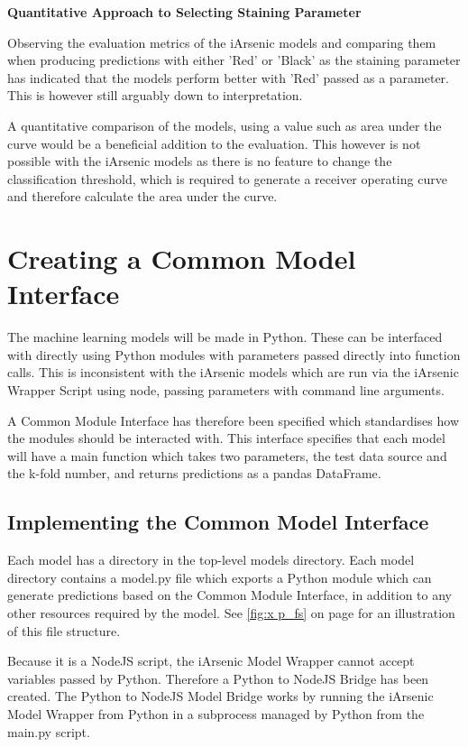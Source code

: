 \newpage

\textbf{Quantitative Approach to Selecting Staining Parameter}

Observing the evaluation metrics of the iArsenic models and comparing them when producing predictions with either 'Red' or 'Black' as the staining parameter has indicated that the models perform better with 'Red' passed as a parameter. This is however still arguably down to interpretation.

A quantitative comparison of the models, using a value such as area under the curve would be a beneficial addition to the evaluation. This however is not possible with the iArsenic models as there is no feature to change the classification threshold, which is required to generate a receiver operating curve and therefore calculate the area under the curve.

\section{Creating a Common Model Interface}

The machine learning models will be made in Python. These can be interfaced with directly using Python modules with parameters passed directly into function calls. This is inconsistent with the iArsenic models which are run via the iArsenic Wrapper Script using node, passing parameters with command line arguments.

A Common Module Interface has therefore been specified which standardises how the modules should be interacted with. This interface specifies that each model will have a main function which takes two parameters, the test data source and the k-fold number, and returns predictions as a pandas DataFrame.

\subsection{Implementing the Common Model Interface}

Each model has a directory in the top-level models directory. Each model directory contains a model.py file which exports a Python module which can generate predictions based on the Common Module Interface, in addition to any other resources required by the model. See \ref{fig:x p_fs} on page \pageref{fig:x p_fs} for an illustration of this file structure.

Because it is a NodeJS script, the iArsenic Model Wrapper cannot accept variables passed by Python. Therefore a Python to NodeJS Bridge has been created. The Python to NodeJS Model Bridge works by running the iArsenic Model Wrapper from Python in a subprocess managed by Python from the main.py script.

